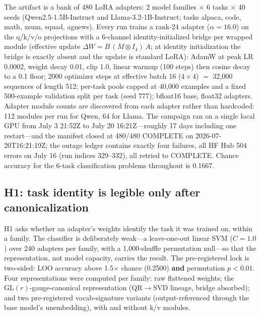 \documentclass{article}
\begin{document}
The artifact is a bank of 480 LoRA adapters: 2 model families $\times$ 6
tasks $\times$ 40 seeds (Qwen2.5-1.5B-Instruct and Llama-3.2-1B-Instruct;
tasks alpaca, code, math, xsum, squad, agnews). Every run trains a rank-24
adapter ($\alpha = 16.0$) on the q/k/v/o projections with a 6-channel
identity-initialized bridge per wrapped module (effective update $\Delta W
= B\,(M \otimes I_4)\,A$; at identity initialization the bridge is exactly
absent and the update is standard LoRA): AdamW at peak LR 0.0002, weight
decay 0.01, clip 1.0, linear warmup (100 steps) then cosine decay to a 0.1
floor; 2000 optimizer steps at effective batch 16 ($4 \times 4$) $=$
32{,}000 sequences of length 512; per-task pools capped at 40{,}000
examples and a fixed 500-example validation split per task (seed 777);
bfloat16 base, float32 adapters. Adapter module counts are discovered from
each adapter rather than hardcoded: 112 modules per run for Qwen, 64 for
Llama. The campaign ran on a single local GPU from July 3 21:52Z to July 20
16:21Z---roughly 17 days including one restart---and the manifest closed at
480/480 COMPLETE on 2026-07-20T16:21:19Z; the outage ledger contains
exactly four failures, all HF Hub 504 errors on July 16 (run indices
329--332), all retried to COMPLETE. Chance accuracy for the 6-task
classification problems throughout is 0.1667.

\subsection{H1: task identity is legible only after canonicalization}
\label{sec:h1}

H1 asks whether an adapter's weights identify the task it was trained on,
within a family. The classifier is deliberately weak---a leave-one-out
linear SVM ($C = 1.0$) over 240 adapters per family, with a 1{,}000-shuffle
permutation null---so that the representation, not model capacity, carries
the result. The pre-registered lock is two-sided: LOO accuracy above
1.5$\times$ chance (0.2500) \textbf{and} permutation $p < 0.01$. Four
representations were computed per family: raw flattened weights; the
$\mathrm{GL}(r)$-gauge-canonical representation (QR$\rightarrow$SVD
lineage, bridge absorbed); and two pre-registered vocab-signature variants
(output-referenced through the base model's unembedding), with and without
k/v modules.
\end{document}
